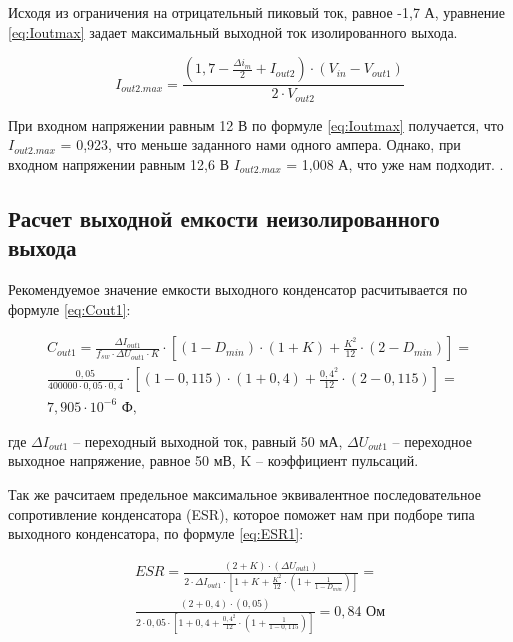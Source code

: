 Исходя из ограничения на отрицательный пиковый ток, равное -1,7 А, уравнение \ref{eq:Ioutmax} задает 
максимальный выходной ток изолированного выхода.

\begin{equation}
   I_{out2.max} = \frac{(1,7 - \frac{\Delta i_{m}}{2} + I_{out2}) \cdot (V_{in} - V_{out1})}{2 \cdot V_{out2}}
\label{eq:Ioutmax}
\end{equation}


При входном напряжении равным 12 В по формуле \ref{eq:Ioutmax} получается, что $I_{out2.max}$ = 0,923, 
что меньше заданного нами одного ампера. Однако, при входном напряжении равным 12,6 В 
$I_{out2.max}$ = 1,008 А, что уже нам подходит. \cite{LMR36520:Aplication Note}. 

\subsection{Расчет выходной емкости неизолированного выхода}
\hspace{1cm} 

Рекомендуемое значение емкости выходного конденсатор расчитывается по формуле \ref{eq:Cout1}:

\begin{eqnarray}
    C_{out1} =
    \frac{\Delta I_{out1}}{f_{sw} \cdot \Delta U_{out1} \cdot K} \cdot 
    [(1 - D_{min}) \cdot (1 + K) + \frac{K^{2}}{12} \cdot (2 - D_{min})] = \nonumber\\
    \frac{0,05}{400000 \cdot 0,05 \cdot 0,4} \cdot 
    [(1 - 0,115) \cdot (1 + 0,4) + \frac{0,4^{2}}{12} \cdot (2 - 0,115)]  =\nonumber \\
    7,905 \cdot 10^{-6} \text{ Ф, }
    \label{eq:Cout1}
\end{eqnarray}

где $\Delta I_{out1}$ -- переходный выходной ток, равный 50 мА, $\Delta U_{out1}$ -- переходное выходное 
напряжение, равное 50 мВ,
K -- коэффициент пульсаций. 

Так же рачситаем предельное максимальное эквивалентное последовательное сопротивление конденсатора (ESR),
 которое поможет 
нам при подборе типа выходного конденсатора, по формуле \ref{eq:ESR1}:

\begin{eqnarray}
    ESR = \frac{(2 + K) \cdot (\Delta U_{out1})}{2 \cdot \Delta I_{out1} \cdot 
    [1 + K + \frac{K^{2}}{12} \cdot (1 + \frac{1}{1 - D_{min}})]} = \nonumber\\
    \frac{(2 + 0,4) \cdot (0,05)}{2 \cdot 0,05 \cdot 
    [1 + 0,4 + \frac{0,4^{2}}{12} \cdot (1 + \frac{1}{1 - 0,115})]} =
    0,84 \text{ Ом}
    \label{eq:ESR1}
\end{eqnarray}

